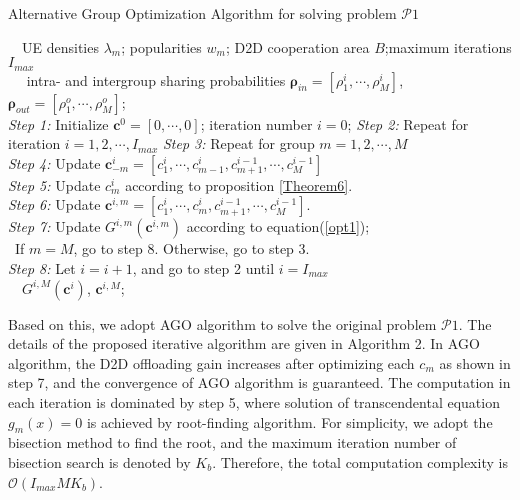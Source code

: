 \documentclass[12pt, draftclsnofoot, onecolumn]{IEEEtran}
\begin{document}
\begin{algorithm}
\caption{Alternative Group Optimization  Algorithm for solving problem $\mathcal{P}1$}  \label{alg2}
\begin{algorithmic}
\REQUIRE ~~UE densities $\lambda_m$; popularities $w_m$; D2D cooperation area $B$;maximum iterations $I_{max}$ \\
\quad \quad~~  intra- and intergroup sharing probabilities $\bm{\rho}_{in}=[\rho_1^i, \cdots,\rho_M^i]$, $\bm{\rho}_{out}=[\rho_1^o, \cdots,\rho_M^o]$;\\
\STATE  \textit{Step 1:} Initialize $\bm{c}^0=[0,\cdots,0]$; iteration number $i=0$;
\STATE  \textit{Step 2:} Repeat for iteration $i=1,2, \cdots, I_{max}$
\STATE  \textit{Step 3:} Repeat for group $m=1,2, \cdots, M$    \\
\STATE \textit{Step 4:} Update $\bm{c}_{-m}^i = [c_1^{i},\cdots,c_{m-1}^{i},c_{m+1}^{i-1},\cdots,c_{M}^{i-1}]$  \\
\STATE \textit{Step 5:} Update $c_m^{i}$ according to proposition \ref{Theorem6}. \\
\STATE \textit{Step 6:} Update $\bm{c}^{i,m}= [c_1^{i},\cdots,c_{m}^{i},c_{m+1}^{i-1},\cdots, c_{M}^{i-1}]$.\\
\STATE \textit{Step 7:} Update $G^{i,m}(\bm{c} ^{i,m})$ according to equation(\ref{opt1}); \\
\quad \quad\quad ~If $m=M$, go to step 8. Otherwise, go to step 3.\\
\STATE \textit{Step 8:} Let $i = i+1$, and go to step 2 until $i= I_{max}$\\
\ENSURE ~~{$G^{i,M}(\bm{c} ^{i})$, $\bm{c}^{i,M}$};
\end{algorithmic}
\end{algorithm}


Based on this, we adopt  AGO algorithm to solve the original problem $\mathcal{P}1$. The details of the proposed iterative algorithm are given in Algorithm 2. In AGO algorithm, the D2D offloading gain increases after optimizing each $c_m$ as shown in step 7, and the convergence of AGO algorithm is guaranteed.
The computation in each iteration is dominated by step 5, where solution of transcendental equation $g_m(x) =0$ is achieved by root-finding algorithm. For simplicity, we adopt the bisection method \cite{bazaraa2013nonlinear} to find the root, and the maximum iteration number of bisection search is denoted by $K_b$. Therefore, the total computation complexity is $\mathcal{O}(I_{max}MK_b)$.
\end{document}
